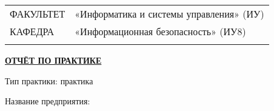 {    \vspace{-.2cm}

    \begin{flushleft}
        \fontsize{12}{12}\selectfont

        \noindent
        \begin{tabular}{ll}
            ФАКУЛЬТЕТ    & «Информатика и системы управления» (ИУ) \\[6pt]
            КАФЕДРА      & «Информационная безопасность» (ИУ8)     \\
            \hspace{3cm} &
        \end{tabular}
    \end{flushleft}
}

\newcommand{\titlestudenttable}{
    \begin{justify}
        \noindent\fontsize{12}{12}\selectfont
        \begin{tabularx}{\textwidth}{@{}X@{}>{\hfill}c@{}v@{}}
            \noindent
            \placesubscript[\practicestudentstatus]{\student}{Студент} & & \\ \cline{3-3} 
            & & {\fontsize{10}{10}\selectfont (подпись, дата)} \\
            \placesubscript{\practicefacilityleader}{Руководитель от предприятия} & & \\ \cline{3-3} 
            & & {\fontsize{10}{10}\selectfont (подпись, дата)} \\
            \placesubscript{\practicereviewer}{Руководитель от кафедры} & & \\ \cline{3-3} 
            & & {\fontsize{10}{10}\selectfont (подпись, дата)} 
        \end{tabularx}
    \end{justify}
}

\leavevmode\titletitle

\begin{center}
    \fontsize{18}{18}\selectfont
    \textbf{\underline{ОТЧЁТ ПО \MakeUppercase{\practicekind} ПРАКТИКЕ}}
\end{center}

\text{}

\begin{justify}
    \fontsize{12}{12}\selectfont

    \noindent
    Тип практики: \practicetype{} практика

    \noindent
    Название предприятия: \practicefacility
\end{justify}

